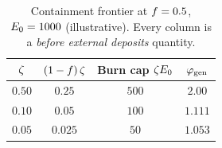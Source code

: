 \documentclass[../main.tex]{subfiles}
\begin{document}
\begin{table}[h!]
    \centering
    \caption{Containment frontier at $f = 0.5$, $E\sb{0} = 1000$
    (illustrative). Every column is a \emph{before external deposits} quantity.}
    \label{tab:containment:frontier}
    \begin{tabular}{@{}c c c c@{}}
        \toprule
        $\zeta$ & $ (1-f)\,\zeta $ & Burn cap $\zeta E\sb{0}$
            & $\varphi\sb{\mathrm{gen}}$ \\
        \midrule
        $0.50$ & $0.25$   & $500$ & $2.00$ \\
        $0.10$ & $0.05$   & $100$ & $1.111$ \\
        $0.05$ & $0.025$  & $50$  & $1.053$ \\
        \bottomrule
    \end{tabular}
\end{table}

\end{document}
